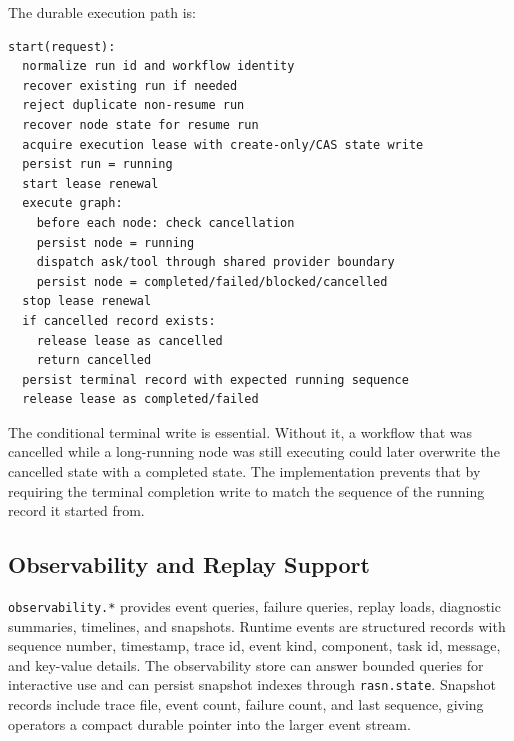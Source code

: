 \documentclass[manuscript,screen,review]{acmart}
\begin{document}
The durable execution path is:

\begin{lstlisting}
start(request):
  normalize run id and workflow identity
  recover existing run if needed
  reject duplicate non-resume run
  recover node state for resume run
  acquire execution lease with create-only/CAS state write
  persist run = running
  start lease renewal
  execute graph:
    before each node: check cancellation
    persist node = running
    dispatch ask/tool through shared provider boundary
    persist node = completed/failed/blocked/cancelled
  stop lease renewal
  if cancelled record exists:
    release lease as cancelled
    return cancelled
  persist terminal record with expected running sequence
  release lease as completed/failed
\end{lstlisting}

The conditional terminal write is essential. Without it, a workflow that was
cancelled while a long-running node was still executing could later overwrite the
cancelled state with a completed state. The implementation prevents that by
requiring the terminal completion write to match the sequence of the running
record it started from.

\subsection{Observability and Replay Support}

\texttt{observability.*} provides event queries, failure queries, replay loads,
diagnostic summaries, timelines, and snapshots. Runtime events are structured
records with sequence number, timestamp, trace id, event kind, component, task
id, message, and key-value details. The observability store can answer bounded
queries for interactive use and can persist snapshot indexes through
\texttt{rasn.state}. Snapshot records include trace file, event count, failure
count, and last sequence, giving operators a compact durable pointer into the
larger event stream.
\end{document}
